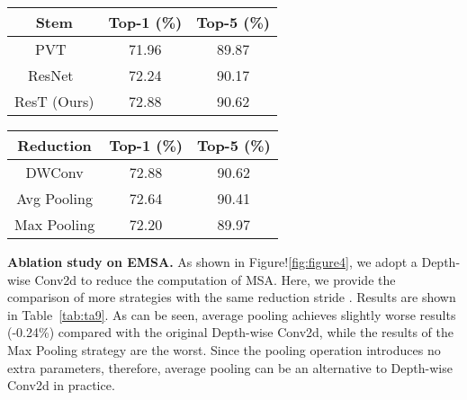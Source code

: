 \documentclass{article}
\begin{document}
\begin{table*}[htb]
	\begin{minipage}{0.49\linewidth}
		\centering
		\caption{Comparison of various stem modules on ResT-Lite. Results show that the proposed stem module is more effective than existing ones in PVT and ResNet.}
		\label{tab:tab5}
\begin{tabular}{ccc}
			\toprule[1.2pt]
			Stem & Top-1 (\%) & Top-5 (\%) \\ 
			\midrule[1.1pt]
			PVT~\cite{wang2021pyramid} & 71.96 & 89.87 \\ 
			\midrule
			ResNet~\cite{DBLP:conf/cvpr/HeZRS16}& 72.24 & 90.17 \\
			\midrule
			ResT (Ours) & 72.88  & 90.62  \\ 
			\bottomrule[1.2pt]
		\end{tabular}


	\end{minipage}
	\hfill
	\begin{minipage}{0.49\linewidth}
	\centering
	\caption{Comparison of different reduction strategies of EMSA on ResT-Lite. Results show that Average Pooling can be an alternative to Depth-wise Conv2d to make a trade-off.}
	\label{tab:ta9}
	\centering
	\begin{tabular}{ccc}
		\toprule[1.2pt]
		Reduction & Top-1 (\%) & Top-5 (\%) \\ 
		\midrule[1.1pt]
		DWConv & 72.88 & 90.62 \\ 
		\midrule
		Avg Pooling & 72.64 & 90.41 \\
		\midrule
		Max Pooling & 72.20 & 89.97 \\
		\bottomrule[1.2pt]
	\end{tabular}
\end{minipage}
\end{table*}

\textbf{Ablation study on EMSA.} As shown in Figure!\ref{fig:figure4}, we adopt a Depth-wise Conv2d to reduce the computation of MSA. Here, we provide the comparison of more strategies with the same reduction stride . Results are shown in Table~\ref{tab:ta9}. As can be seen, average pooling achieves slightly worse results (-0.24\%) compared with the original Depth-wise Conv2d, while the results of the Max Pooling strategy are the worst. Since the pooling operation introduces no extra parameters, therefore, average pooling can be an alternative to Depth-wise Conv2d in practice. 
\end{document}
